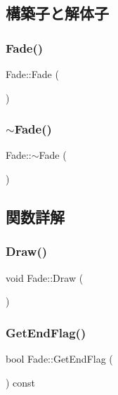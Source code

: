 \subsection{構築子と解体子}
\mbox{\label{class_fade_aec1ac5a0a80be8d7a2a43dbde2a741ee}} 
\subsubsection{\texorpdfstring{Fade()}{Fade()}}
{\footnotesize\ttfamily Fade\+::\+Fade (\begin{DoxyParamCaption}{ }\end{DoxyParamCaption})}

\mbox{\label{class_fade_a58ddf7585cb85bf84f5e83adbe2734f9}} 
\subsubsection{\texorpdfstring{$\sim$\+Fade()}{~Fade()}}
{\footnotesize\ttfamily Fade\+::$\sim$\+Fade (\begin{DoxyParamCaption}{ }\end{DoxyParamCaption})}



\subsection{関数詳解}
\mbox{\label{class_fade_a521f3cb7e82fb71360bab568bcf933c9}} 
\subsubsection{\texorpdfstring{Draw()}{Draw()}}
{\footnotesize\ttfamily void Fade\+::\+Draw (\begin{DoxyParamCaption}{ }\end{DoxyParamCaption})}

\mbox{\label{class_fade_acc8adf28ce2e4270e5fb3907d83dadd0}} 
\subsubsection{\texorpdfstring{Get\+End\+Flag()}{GetEndFlag()}}
{\footnotesize\ttfamily bool Fade\+::\+Get\+End\+Flag (\begin{DoxyParamCaption}{ }\end{DoxyParamCaption}) const\hspace{0.3cm}{\ttfamily [inline]}}

